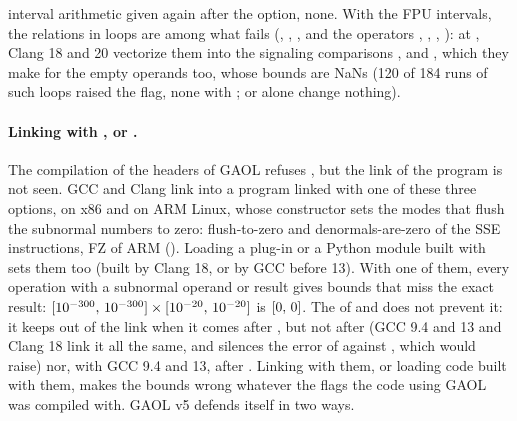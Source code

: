 \documentclass[12pt,a4paper,twoside,openright]{book}
\begin{document}
\begin{itemize}
  interval arithmetic given again after the option, none. With the FPU
  intervals, the relations in loops are among what fails
  (, , ,
   and the operators \code{<}, \code{<=}, \code{>},
  \code{>=}): at , Clang 18 and 20 vectorize them
  into the signaling comparisons ,  and
  , which they make for the empty operands too, whose bounds
  are NaNs (120 of 184 runs of such loops raised the flag, none with
  ;  or
   alone change nothing).
\end{itemize}

\paragraph{Linking with ,  or
.}
%
The compilation of the headers of GAOL refuses , but the
link of the program is not seen. GCC and Clang link  into
a program linked with one of these three options, on x86 and on ARM Linux,
whose constructor sets the modes that flush the subnormal numbers to zero:
flush-to-zero and denormals-are-zero of the SSE instructions, FZ of ARM
(). Loading a plug-in or a Python module built with
 sets them too (built by Clang 18, or by GCC before 13). With
one of them, every operation with a subnormal operand or result gives bounds
that miss the exact result: $[10^{-300},\,10^{-300}] \times
[10^{-20},\,10^{-20}]$ is $[0,\,0]$. The  of
 and  does not prevent it: it keeps
 out of the link when it comes after ,
but not after  (GCC 9.4 and 13 and Clang 18 link it all the
same, and  silences the error of
 against , which 
would raise) nor, with GCC 9.4 and 13, after
. Linking with them, or loading code built
with them, makes the bounds wrong whatever the flags the code using GAOL was
compiled with. GAOL v5 defends itself in two ways.\newinvfive
\end{document}
